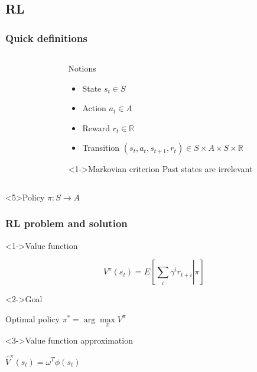 \documentclass{beamer}
\begin{document}
\subsection{RL}
\label{sec-2_1}
\begin{frame}
\frametitle{Quick definitions}
\label{sec-2_1_1}

       \begin{columns}
    \begin{column}{4cm}
      \begin{block}{}
        \begin{overlayarea}{\textwidth}{4.4cm}
          \only<1>{}
          \only<2>{}
          \only<3>{}
        \end{overlayarea}
      \end{block}
    \end{column}
    \begin{column}{4cm}
      \begin{block}{Notions}
        \begin{itemize}
          \item<1-> State $s_t\in S$
          \item<2-> Action $a_t \in A$
          \item<3-> Reward $r_t \in \mathbb{R}$
          \item<4-> Transition $(s_t,a_t,s_{t+1},r_t)\in S\times A\times S\times\mathbb{R}$
        \end{itemize}
      \end{block}
      \begin{block}<1->{Markovian criterion}
        Past states are irrelevant
      \end{block}
    \end{column}
  \end{columns}
  \begin{alertblock}<5>{Policy}
    $\pi: S\rightarrow A$
  \end{alertblock}
\end{frame}
\begin{frame}
\frametitle{RL problem and solution}
\label{sec-2_1_2}
\begin{block}<1->{Value function}
\label{sec-2_1_2_1}

     \begin{equation}
     \label{eqn:V}
     V^\pi(s_t) = E\left[\left.\sum\limits_{i}\gamma^i r_{t+i}\right|\pi\right]
     \end{equation}
\end{block}
\begin{block}<2->{Goal}
\label{sec-2_1_2_2}

     Optimal policy $\pi^* = \arg\max\limits_\pi V^\pi$
\end{block}
\begin{block}<3->{Value function approximation}
\label{sec-2_1_2_3}

     $\hat V^\pi(s_t) = \omega^T\phi (s_t)$
\end{block}
\end{frame}
\end{document}
